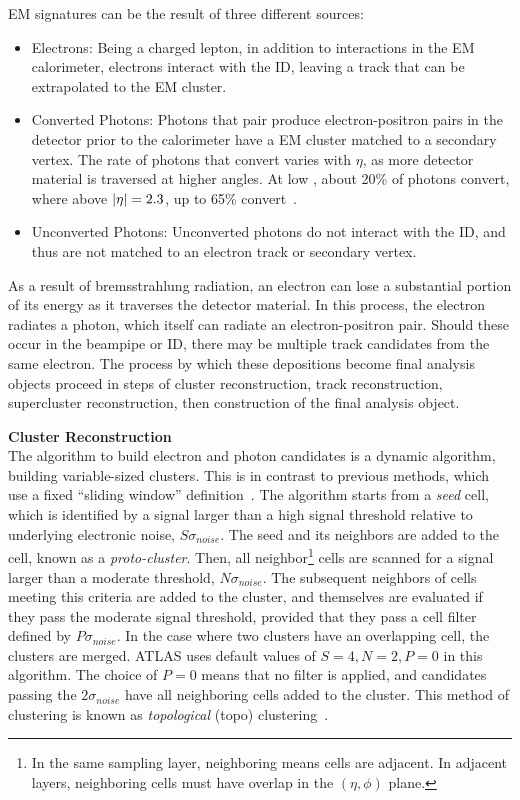 \gls{EM} signatures can be the result of three different sources:
\begin{itemize}
    \item Electrons: Being a charged lepton, in addition to interactions in the \gls{EM} calorimeter, electrons interact with the \gls{ID}, leaving a track that can be extrapolated to the \gls{EM} cluster.
    \item Converted Photons: Photons that pair produce electron-positron pairs in the detector prior to the calorimeter have a \gls{EM} cluster matched to a secondary vertex. The rate of photons that convert varies with $\eta$, as more detector material is traversed at higher angles. At low \abseta, about 20\% of photons convert, where above $|\eta|=2.3$, up to 65\% convert~\cite{photon-electron-perf}.
    \item Unconverted Photons: Unconverted photons do not interact with the \gls{ID}, and thus are not matched to an electron track or secondary vertex.
\end{itemize}

As a result of bremsstrahlung radiation, an electron can lose a substantial portion of its energy as it traverses the detector material. In this process, the electron radiates a photon, which itself can radiate an electron-positron pair. Should these occur in the beampipe or \gls{ID}, there may be multiple track candidates from the same electron. The process by which these depositions become final analysis objects proceed in steps of cluster reconstruction, track reconstruction, supercluster reconstruction, then construction of the final analysis object.


\noindent\textbf{Cluster Reconstruction}\\
\indent The algorithm to build electron and photon candidates is a dynamic algorithm, building variable-sized clusters. This is in contrast to previous methods, which use a fixed ``sliding window'' definition~\cite{sliding-window}. The algorithm starts from a \textit{seed} cell, which is identified by a signal larger than a high signal threshold relative to underlying electronic noise, $S\sigma_{noise}$. The seed and its neighbors are added to the cell, known as a \textit{proto-cluster}. Then, all neighbor\footnote{In the same sampling layer, neighboring means cells are adjacent. In adjacent layers, neighboring cells must have overlap in the $(\eta,\phi)$ plane.} cells are scanned for a signal larger than a moderate threshold, $N\sigma_{noise}$. The subsequent neighbors of cells meeting this criteria are added to the cluster, and themselves are evaluated if they pass the moderate signal threshold, provided that they pass a cell filter defined by $P\sigma_{noise}$. In the case where two clusters have an overlapping cell, the clusters are merged. ATLAS uses default values of $S=4,N=2,P=0$ in this algorithm. The choice of $P=0$ means that no filter is applied, and candidates passing the $2\sigma_{noise}$ have all neighboring cells added to the cluster. This method of clustering is known as  \textit{topological} (topo) clustering~\cite{topo-cluster}. 

